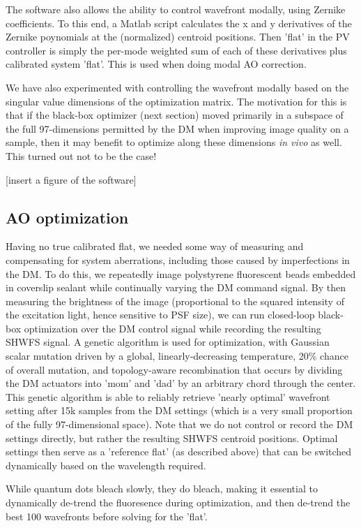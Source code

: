 \documentclass[a4paper,12pt]{article}
\begin{document}
The software also allows the ability to control wavefront modally, using Zernike coefficients.   To this end, a Matlab script calculates the x and y derivatives of the Zernike poynomials at the (normalized) centroid positions.  Then 'flat' in the PV controller is simply the per-mode weighted sum of each of these derivatives plus calibrated system 'flat'.  This is used when doing modal AO correction.  

We have also experimented with controlling the wavefront modally based on the singular value dimensions of the optimization matrix.  The motivation for this is that if the black-box optimizer (next section) moved primarily in a subspace of the full 97-dimensions permitted by the DM when improving image quality on a sample, then it may benefit to optimize along these dimensions \textit{in vivo} as well.  This turned out not to be the case!  

[insert a figure of the software] 

\subsection {AO optimization}

Having no true calibrated flat, we needed some way of measuring and compensating for system aberrations, including those caused by imperfections in the DM.  To do this, we repeatedly image polystyrene fluorescent beads embedded in coverslip sealant while continually varying the DM command signal.  By then measuring the brightness of the image (proportional to the squared intensity of the excitation light, hence sensitive to PSF size), we can run closed-loop black-box optimization over the DM control signal while recording the resulting SHWFS signal.  A genetic algorithm is used for optimization, with Gaussian scalar mutation driven by a global, linearly-decreasing temperature, 20\% chance of overall mutation, and topology-aware recombination that occurs by dividing the DM actuators into 'mom' and 'dad' by an arbitrary chord through the center.  This genetic algorithm is able to reliably retrieve 'nearly optimal' wavefront setting after 15k samples from the DM settings (which is a very small proportion of the fully 97-dimensional space).  Note that we do not control or record the DM settings directly, but rather the resulting SHWFS centroid positions.  Optimal settings then serve as a 'reference flat' (as described above) that can be switched dynamically based on the wavelength required.  

While quantum dots bleach slowly, they do bleach, making it essential to dynamically de-trend the fluoresence during optimization, and then de-trend the best 100 wavefronts before solving for the 'flat'.
\end{document}
